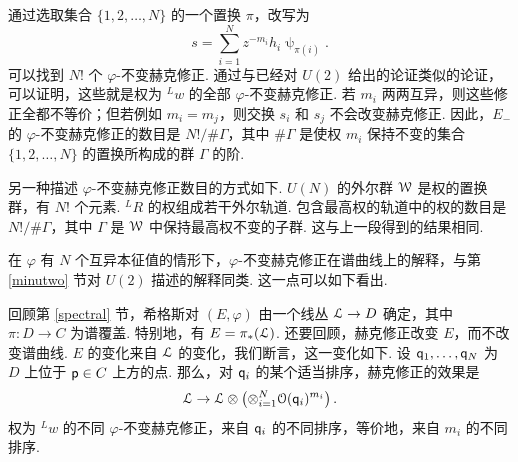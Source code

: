通过选取集合 $\{1,2,\dots,N\}$ 的一个置换 $\pi$，改写为
\begin{equation}
\label{znnno}
s=\sum_{i=1}^N z^{-m_i}h_i\uppsi_{\pi(i)}.
\end{equation}
可以找到 $N!$ 个 $\varphi$-不变赫克修正.
通过与已经对 $U(2)$ 给出的论证类似的论证，可以证明，这些就是权为 $^Lw$ 的全部 $\varphi$-不变赫克修正.
若 $m_i$ 两两互异，则这些修正全都不等价；但若例如 $m_i=m_j$，则交换 $s_i$ 和 $s_j$ 不会改变赫克修正.
因此，$E_-$ 的 $\varphi$-不变赫克修正的数目是 $N!/\#\Gamma$，其中 $\#\Gamma$ 是使权 $m_i$ 保持不变的集合 $\{1,2,\dots,N\}$ 的置换所构成的群 $\Gamma$ 的阶.

另一种描述 $\varphi$-不变赫克修正数目的方式如下.
$U(N)$ 的外尔群 $ {\cal W}$ 是权的置换群，有 $N!$ 个元素.
$^LR$ 的权组成若干外尔轨道.
包含最高权的轨道中的权的数目是 $N!/\#\Gamma$，其中 $\Gamma$ 是 $ {\cal W}$ 中保持最高权不变的子群.
这与上一段得到的结果相同.

在 $\varphi$ 有 $N$ 个互异本征值的情形下，$\varphi$-不变赫克修正在谱曲线上的解释，与第 \ref{minutwo} 节对 $U(2)$ 描述的解释同类.
这一点可以如下看出.

回顾第 \ref{spectral} 节，希格斯对 $(E,\varphi)$ 由一个线丛 $ {\cal L}\to D$ 确定，其中 $\pi:D\to C$ 为谱覆盖.
特别地，有 $E=\pi_*({\cal L})$.
还要回顾，赫克修正改变 $E$，而不改变谱曲线.
$E$ 的变化来自 $ {\cal L}$ 的变化，我们断言，这一变化如下.
设 ${\sf q}_1,\dots,{\sf q}_N$ 为 $D$ 上位于 ${\sf p}\in C$ 上方的点.
那么，对 ${\sf q}_i$ 的某个适当排序，赫克修正的效果是
\begin{equation}\label{effheck}
{\cal L}\to {\cal L}\otimes \left(\otimes_{i=1}^N{\cal
O}({\sf q}_i)^{m_i}\right).\end{equation}
权为 $^Lw$ 的不同 $\varphi$-不变赫克修正，来自 ${\sf q}_i$ 的不同排序，等价地，来自 $m_i$ 的不同排序.

